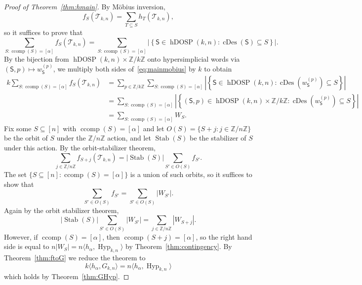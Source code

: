 \documentclass[10pt,a4paper]{amsart}
\theoremstyle{plain}
\theoremstyle{definition}
\newcommand{\Z}{\mathbb{Z}}
\newcommand{\Tri}{\mathcal{T}_{k,n}}
\newcommand{\dosp}{\mathsf{S}}
\DeclareMathOperator{\ccomp}{ccomp}
\DeclareMathOperator{\Hyp}{Hyp}
\DeclareMathOperator{\Stab}{Stab}
\DeclareMathOperator{\cDes}{cDes}
\DeclareMathOperator{\hDOSP}{hDOSP}
\begin{document}
\begin{proof}[Proof of Theorem~\ref{thm:hmain}]
	By M\"obius inversion,
	\[
		f_S(\Tri) = \sum_{T \subseteq S} h_T(\Tri),
	\]
	so it suffices to prove that
	\begin{equation}\label{eq:mainmobius}
		\sum_{S: \ccomp(S) = [\alpha]} f_S(\Tri) = \sum_{S: \ccomp(S) = [\alpha]} \left| \left\{ \dosp \in \hDOSP(k,n): \cDes(\dosp) \subseteq S \right\} \right|.
	\end{equation}
	By the bijection from $\hDOSP(k,n) \times \Z/k\Z $ onto hypersimplicial words via $(\dosp, p)\mapsto w_\dosp^{(p)}$,
	we multiply both sides of~\eqref{eq:mainmobius} by $k$ to obtain
	\begin{equation}
		\begin{aligned}
			k\sum_{S: \ccomp(S) = [\alpha]} f_S(\Tri) & = \sum_{p \in \Z/k\Z}\sum_{S: \ccomp(S) = [\alpha]} \left| \left\{ \dosp \in \hDOSP(k,n): \cDes(w_\dosp^{(p)}) \subseteq S \right\} \right| \\
			                                          & = \sum_{S: \ccomp(S) = [\alpha]} \left| \left\{ (\dosp,p) \in \hDOSP(k,n) \times \Z/k\Z: \cDes(w_\dosp^{(p)}) \subseteq S \right\} \right| \\
			                                          & = \sum_{S: \ccomp(S) = [\alpha]} W_S.
		\end{aligned}
	\end{equation}
	Fix some $S \subseteq [n]$ with $\ccomp(S) = [\alpha]$ and let $O(S) = \{S+j: j \in \Z/n\Z\}$ be the orbit of $S$ under the $\Z/n\Z$ action, and let $\Stab(S)$ be the stabilizer of $S$ under this action.
	By the orbit-stabilizer theorem,
	\[
		\sum_{j \in \Z/n\Z} f_{S+j}(\Tri) = |\Stab(S)| \sum_{S' \in O(S)} f_{S'}.
	\]
	The set $\{S \subseteq [n]: \ccomp(S) = [\alpha]\}$ is a union of such orbits, so it suffices to show that
	\[
		\sum_{S' \in O(S)} f_{S'} = \sum_{S' \in O(S)} |W_{S'}|.
	\]
	Again by the orbit stabilizer theorem,
	\[
		|\Stab(S)| \sum_{S' \in O(S)} |W_{S'}| = \sum_{j \in \Z/n\Z} |W_{S+j}|.
	\]
	However, if $\ccomp(S) = [\alpha]$, then $\ccomp(S+j) = [\alpha]$, so the right hand side is equal to $n |W_S| = n
	\langle h_\alpha, \Hyp_{k,n}\rangle$ by Theorem~\ref{thm:contingency}. By Theorem~\ref{thm:ftoG} we reduce the theorem to
	\[
		k \langle h_\alpha, G_{k,n} \rangle = n \langle h_\alpha, \Hyp_{k,n} \rangle
	\]
	which holds by Theorem~\ref{thm:GHyp}.
\end{proof}





\end{document}
